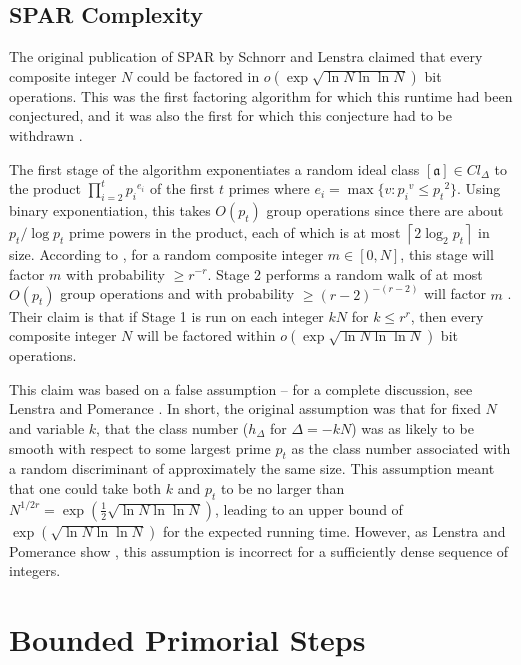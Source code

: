 \documentclass{ucalgthes1}
\theoremstyle{definition}
\newcommand{\ceil}[1]{\left\lceil #1 \right\rceil}
\newcommand{\ideal}{\mathfrak}
\newcommand{\idealclass}[1]{\left[ \ideal #1 \right]}
\newcommand{\aclass}{\idealclass a}
\begin{document}
\subsection{SPAR Complexity}


The original publication of SPAR by Schnorr and Lenstra \cite{Schnorr1984} claimed that every composite integer $N$ could be factored in $o\left(\exp\sqrt{\ln N \ln\ln N}\right)$ bit operations.  This was the first factoring algorithm for which this runtime had been conjectured, and it was also the first for which this conjecture had to be withdrawn \cite{Lenstra1992}.

The first stage of the algorithm exponentiates a random ideal class $\aclass \in Cl_\Delta$ to the product $\prod_{i=2}^t {p_i}^{e_i}$ of the first $t$ primes where $e_i = \max \{ v : {p_i}^v \le {p_t}^2 \}$.  Using binary exponentiation, this takes $O(p_t)$ group operations since there are about $p_t / \log p_t$ prime powers in the product, each of which is at most $\ceil{2 \log_2 p_t}$ in size. According to \cite[p.290]{Schnorr1984}, for a random composite integer $m \in [0, N]$, this stage will factor $m$ with probability $\ge r^{-r}$. Stage 2 performs a random walk of at most $O(p_t)$ group operations and with probability $\ge (r-2)^{-(r-2)}$ will factor $m$ \cite[p.290]{Schnorr1984}.  Their claim is that if Stage 1 is run on each integer $kN$ for $k \le r^r$, then every composite integer $N$ will be factored within $o\left(\exp \sqrt{ \ln N \ln\ln N } \right)$ bit operations.

This claim was based on a false assumption -- for a complete discussion, see Lenstra and Pomerance \cite[\S 11]{Lenstra1992}.  In short, the original assumption was that for fixed $N$ and variable $k$, that the class number ($h_\Delta$ for $\Delta = -kN$) was as likely to be smooth with respect to some largest prime $p_t$ as the class number associated with a random discriminant of approximately the same size.  This assumption meant that one could take both $k$ and $p_t$ to be no larger than $N^{1/2r} = \exp\left(\frac{1}{2}\sqrt{\ln N \ln \ln N}\right)$, leading to an upper bound of $\exp\left(\sqrt{\ln N \ln \ln N}\right)$ for the expected running time.  However, as Lenstra and Pomerance show \cite[\S 11]{Lenstra1992}, this assumption is incorrect for a sufficiently dense sequence of integers.


\section{Bounded Primorial Steps}
\label{sec:primorial}
\end{document}
